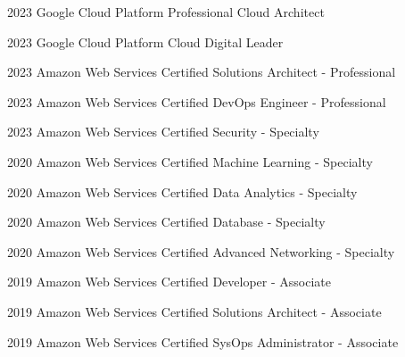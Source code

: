 \education
  {2023}
  {Google Cloud Platform}
  {Professional Cloud Architect}

\education
  {2023}
  {Google Cloud Platform}
  {Cloud Digital Leader}

\education
  {2023}
  {Amazon Web Services}
  {Certified Solutions Architect - Professional}

\education
  {2023}
  {Amazon Web Services}
  {Certified DevOps Engineer - Professional}

\education
  {2023}
  {Amazon Web Services}
  {Certified Security - Specialty}

\education
  {2020}
  {Amazon Web Services}
  {Certified Machine Learning - Specialty}

\education
  {2020}
  {Amazon Web Services}
  {Certified Data Analytics - Specialty}

\education
  {2020}
  {Amazon Web Services}
  {Certified Database - Specialty}

\education
  {2020}
  {Amazon Web Services}
  {Certified Advanced Networking - Specialty}

\education
  {2019}
  {Amazon Web Services}
  {Certified Developer - Associate}

\education
  {2019}
  {Amazon Web Services}
  {Certified Solutions Architect - Associate}

\education
  {2019}
  {Amazon Web Services}
  {Certified SysOps Administrator - Associate}
